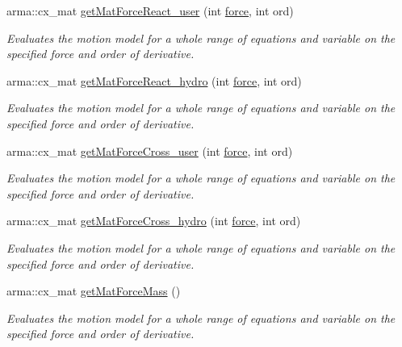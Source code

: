 \begin{DoxyCompactItemize}
arma\-::cx\-\_\-mat \hyperlink{classosea_1_1ofreq_1_1_motion_model_a44e885c0255e74d82664c785499138f0}{get\-Mat\-Force\-React\-\_\-user} (int \hyperlink{input__syntax_8dox_ab0a92c70357da47fe86696522eab7dc8}{force}, int ord)
\begin{DoxyCompactList}\small\item\em Evaluates the motion model for a whole range of equations and variable on the specified force and order of derivative. \end{DoxyCompactList}\item 
arma\-::cx\-\_\-mat \hyperlink{classosea_1_1ofreq_1_1_motion_model_af239389973af6d198a21ee0c07db19c6}{get\-Mat\-Force\-React\-\_\-hydro} (int \hyperlink{input__syntax_8dox_ab0a92c70357da47fe86696522eab7dc8}{force}, int ord)
\begin{DoxyCompactList}\small\item\em Evaluates the motion model for a whole range of equations and variable on the specified force and order of derivative. \end{DoxyCompactList}\item 
arma\-::cx\-\_\-mat \hyperlink{classosea_1_1ofreq_1_1_motion_model_addbd875f2fc266823f645fc7f2d207e8}{get\-Mat\-Force\-Cross\-\_\-user} (int \hyperlink{input__syntax_8dox_ab0a92c70357da47fe86696522eab7dc8}{force}, int ord)
\begin{DoxyCompactList}\small\item\em Evaluates the motion model for a whole range of equations and variable on the specified force and order of derivative. \end{DoxyCompactList}\item 
arma\-::cx\-\_\-mat \hyperlink{classosea_1_1ofreq_1_1_motion_model_a7d661c296c3fe5c97322a62cceabb5d4}{get\-Mat\-Force\-Cross\-\_\-hydro} (int \hyperlink{input__syntax_8dox_ab0a92c70357da47fe86696522eab7dc8}{force}, int ord)
\begin{DoxyCompactList}\small\item\em Evaluates the motion model for a whole range of equations and variable on the specified force and order of derivative. \end{DoxyCompactList}\item 
arma\-::cx\-\_\-mat \hyperlink{classosea_1_1ofreq_1_1_motion_model_a7215db9f6f0c3e79f4559a4b9eadbcfc}{get\-Mat\-Force\-Mass} ()
\begin{DoxyCompactList}\small\item\em Evaluates the motion model for a whole range of equations and variable on the specified force and order of derivative. \end{DoxyCompactList}\item 

\end{DoxyCompactItemize}

